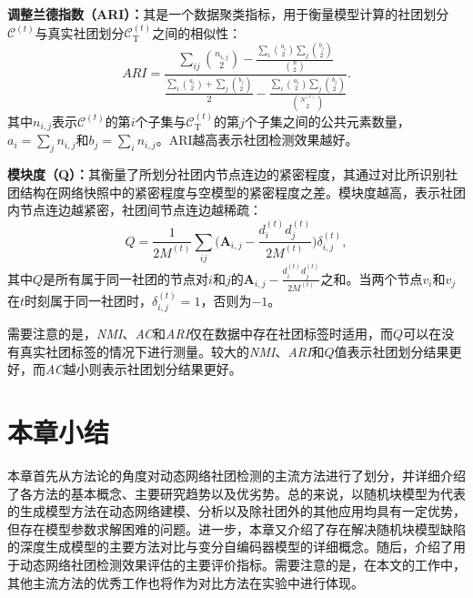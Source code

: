 \textbf{调整兰德指数（ARI）：}其是一个数据聚类指标，用于衡量模型计算的社团划分$\mathcal{C}^{(t)}$与真实社团划分$\mathcal{C}_{\mathrm{T}}^{(t)}$之间的相似性：
     \begin{equation}
      ARI = \dfrac{\sum_{ij}\binom{n_{i,j}}{2}-
      \frac{\sum_{i}\binom{a_{i}}{2} \sum_{j}\binom{b_{j}}{2}}{\binom{n}{2}}}{\frac{ \sum_{i}\binom{a_{i}}{2}+ \sum_{j}\binom{b_{j}}{2} }{2}-\frac{\sum_{i}\binom{a_{i}}{2} \sum_{j}\binom{b_{j}}{2}}{\binom{N^{(t)}}{2}}}.
      \end{equation}
其中$n_{i,j}$表示$\mathcal{C}^{(t)}$的第$i$个子集与$\mathcal{C}_{\mathrm{T}}^{(t)}$的第$j$个子集之间的公共元素数量，$a_i = \sum_{j}n_{i,j}$和$b_j = \sum_{i}n_{i,j}$。ARI越高表示社团检测效果越好。

\textbf{模块度（Q）：}其衡量了所划分社团内节点连边的紧密程度，其通过对比所识别社团结构在网络快照中的紧密程度与空模型的紧密程度之差。模块度越高，表示社团内节点连边越紧密，社团间节点连边越稀疏：
     \begin{equation}
       Q = \frac{1}{2M^{(t)}}\sum_{ij}\bigg( \mathbf{A}_{i,j}-\frac{d_{i}^{(t)}d_{j}^{(t)}}{2M^{(t)}} \bigg)\delta_{i,j}^{(t)},
      \end{equation}
其中$Q$是所有属于同一社团的节点对$i$和$j$的$ \mathbf{A}_{i,j}-\frac{d_{i}^{(t)}d_{j}^{(t)}}{2M^{(t)}}$之和。当两个节点$v_i$和$v_j$在$t$时刻属于同一社团时，$\delta_{i,j}^{(t)}=1$，否则为$-1$。

需要注意的是，\emph{NMI}、\emph{AC}和\emph{ARI}仅在数据中存在社团标签时适用，而$Q$可以在没有真实社团标签的情况下进行测量。较大的\emph{NMI}、\emph{ARI}和$Q$值表示社团划分结果更好，而\emph{AC}越小则表示社团划分结果更好。

\section{本章小结}
本章首先从方法论的角度对动态网络社团检测的主流方法进行了划分，并详细介绍了各方法的基本概念、主要研究趋势以及优劣势。总的来说，以随机块模型为代表的生成模型方法在动态网络建模、分析以及除社团外的其他应用均具有一定优势，但存在模型参数求解困难的问题。进一步，本章又介绍了存在解决随机块模型缺陷的深度生成模型的主要方法对比与变分自编码器模型的详细概念。随后，介绍了用于动态网络社团检测效果评估的主要评价指标。需要注意的是，在本文的工作中，其他主流方法的优秀工作也将作为对比方法在实验中进行体现。

